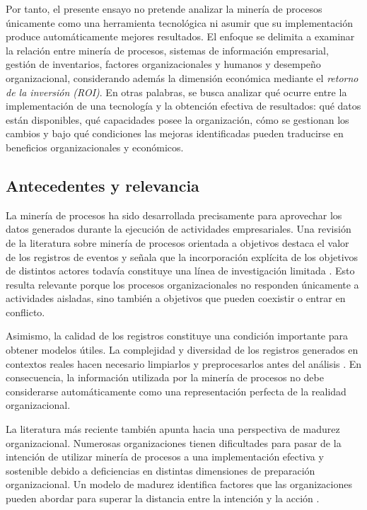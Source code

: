 \documentclass{article}
\begin{document}
    Por tanto, el presente ensayo no pretende analizar la minería de procesos únicamente como una herramienta tecnológica ni asumir que su implementación produce automáticamente mejores resultados. El enfoque se delimita a examinar la relación entre minería de procesos, sistemas de información empresarial, gestión de inventarios, factores organizacionales y humanos y desempeño organizacional, considerando además la dimensión económica mediante el \textit{retorno de la inversión (ROI)}. En otras palabras, se busca analizar qué ocurre entre la implementación de una tecnología y la obtención efectiva de resultados: qué datos están disponibles, qué capacidades posee la organización, cómo se gestionan los cambios y bajo qué condiciones las mejoras identificadas pueden traducirse en beneficios organizacionales y económicos.

    \subsection{Antecedentes y relevancia}

    La minería de procesos ha sido desarrollada precisamente para aprovechar los datos generados durante la ejecución de actividades empresariales. Una revisión de la literatura sobre minería de procesos orientada a objetivos destaca el valor de los registros de eventos y señala que la incorporación explícita de los objetivos de distintos actores todavía constituye una línea de investigación limitada \cite{ghasemi2020eventlogs}. Esto resulta relevante porque los procesos organizacionales no responden únicamente a actividades aisladas, sino también a objetivos que pueden coexistir o entrar en conflicto.

    Asimismo, la calidad de los registros constituye una condición importante para obtener modelos útiles. La complejidad y diversidad de los registros generados en contextos reales hacen necesario limpiarlos y preprocesarlos antes del análisis \cite{marin-castro2021preprocessing}. En consecuencia, la información utilizada por la minería de procesos no debe considerarse automáticamente como una representación perfecta de la realidad organizacional.

    La literatura más reciente también apunta hacia una perspectiva de madurez organizacional. Numerosas organizaciones tienen dificultades para pasar de la intención de utilizar minería de procesos a una implementación efectiva y sostenible debido a deficiencias en distintas dimensiones de preparación organizacional. Un modelo de madurez identifica factores que las organizaciones pueden abordar para superar la distancia entre la intención y la acción \cite{processminingmaturity2024}.
\end{document}
